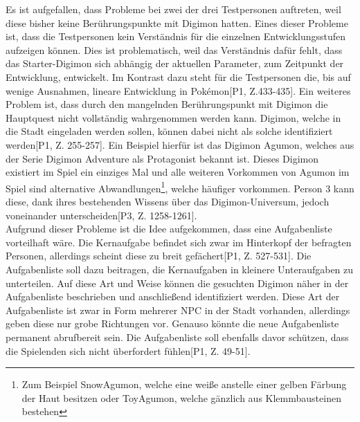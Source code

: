 Es ist aufgefallen, dass Probleme bei zwei der drei Testpersonen auftreten, weil diese bisher keine Berührungspunkte mit Digimon hatten.
Eines dieser Probleme ist, dass die Testpersonen kein Verständnis für die einzelnen Entwicklungsstufen aufzeigen können.
Dies ist problematisch, weil das Verständnis dafür fehlt, dass das Starter-Digimon sich abhängig der aktuellen Parameter, zum Zeitpunkt der Entwicklung, entwickelt.
Im Kontrast dazu steht für die Testpersonen die, bis auf wenige Ausnahmen, lineare Entwicklung in Pokémon[P1, Z.433-435].
Ein weiteres Problem ist, dass durch den mangelnden Berührungspunkt mit Digimon die Hauptquest nicht vollständig wahrgenommen werden kann.
Digimon, welche in die Stadt eingeladen werden sollen, können dabei nicht als solche identifiziert werden[P1, Z. 255-257].
Ein Beispiel hierfür ist das Digimon Agumon, welches aus der Serie Digimon Adventure als Protagonist bekannt ist.
Dieses Digimon existiert im Spiel ein einziges Mal und alle weiteren Vorkommen von Agumon im Spiel sind alternative Abwandlungen\footnote{Zum Beispiel SnowAgumon, welche eine weiße anstelle einer gelben Färbung der Haut besitzen oder ToyAgumon, welche gänzlich aus Klemmbausteinen bestehen}, welche häufiger vorkommen.
Person 3 kann diese, dank ihres bestehenden Wissens über das Digimon-Universum, jedoch voneinander unterscheiden[P3, Z. 1258-1261].\\

Aufgrund dieser Probleme ist die Idee aufgekommen, dass eine Aufgabenliste vorteilhaft wäre\hypothesis[P1, Z. 533].
Die Kernaufgabe befindet sich zwar im Hinterkopf der befragten Personen, allerdings scheint diese zu breit gefächert[P1, Z. 527-531].
Die Aufgabenliste soll dazu beitragen, die Kernaufgaben in kleinere Unteraufgaben zu unterteilen.
Auf diese Art und Weise können die gesuchten Digimon näher in der Aufgabenliste beschrieben und anschließend identifiziert werden.
Diese Art der Aufgabenliste ist zwar in Form mehrerer \ac{NPC} in der Stadt vorhanden, allerdings geben diese nur grobe Richtungen vor.
Genauso könnte die neue Aufgabenliste permanent abrufbereit sein. Die Aufgabenliste soll ebenfalls davor schützen, dass die Spielenden sich nicht überfordert fühlen[P1, Z. 49-51].\\

